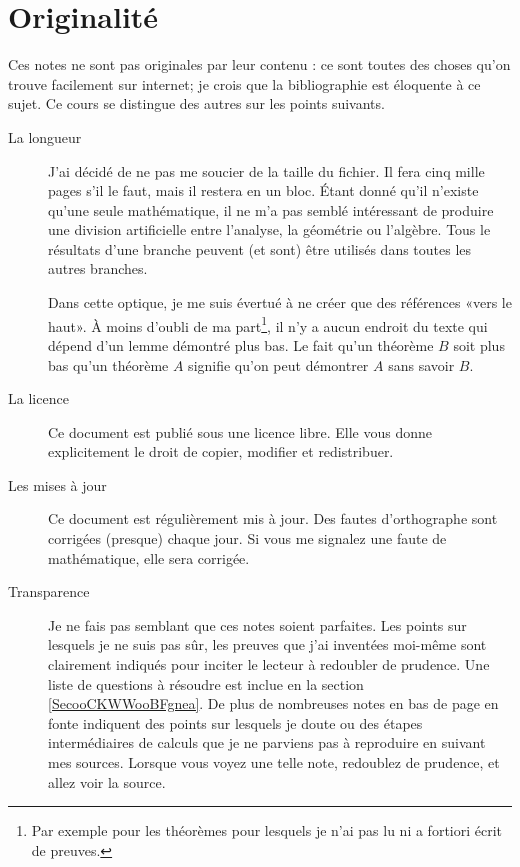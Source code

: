 
\section{Originalité}

Ces notes ne sont pas originales par leur contenu : ce sont toutes des choses qu'on trouve facilement sur internet; je crois que la bibliographie est éloquente à ce sujet. Ce cours se distingue des autres sur les points suivants.
\begin{description}
    \item[La longueur] J'ai décidé de ne pas me soucier de la taille du fichier. Il fera
      cinq mille pages s'il le faut, mais il restera en un bloc. Étant donné qu'il n'existe qu'une seule mathématique, il ne m'a pas semblé intéressant de produire une division artificielle entre l'analyse, la géométrie ou l'algèbre. Tous le résultats d'une branche peuvent (et sont) être utilisés dans toutes les autres branches.

        Dans cette optique, je me suis évertué à ne créer que des références «vers le haut». À moins d'oubli de ma part\footnote{Par exemple pour les théorèmes pour lesquels je n'ai pas lu ni a fortiori écrit de preuves.}, il n'y a aucun endroit du texte qui dépend d'un lemme démontré plus bas. Le fait qu'un théorème \( B\) soit plus bas qu'un théorème \( A\) signifie qu'on peut démontrer \( A\) sans savoir \( B\).

    \item[La licence] Ce document est publié sous une licence libre. Elle vous donne explicitement le droit de copier, modifier et redistribuer. 

    \item[Les mises à jour] Ce document est régulièrement mis à jour. Des fautes d'orthographe sont corrigées (presque) chaque jour. Si vous me signalez une faute de mathématique, elle sera corrigée.
    \item[Transparence] Je ne fais pas semblant que ces notes soient parfaites. Les points sur lesquels je ne suis pas sûr, les preuves que j'ai inventées moi-même sont clairement indiqués pour inciter le lecteur à redoubler de prudence. Une liste de questions à résoudre est inclue en la section \ref{SecooCKWWooBFgnea}. De plus de nombreuses notes en bas de page en fonte  indiquent des points sur lesquels je doute ou des étapes intermédiaires de calculs que je ne parviens pas à reproduire en suivant mes sources. Lorsque vous voyez une telle note, redoublez de prudence, et allez voir la source.
        
\end{description}

